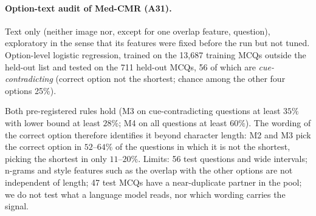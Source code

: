 \paragraph{Option-text audit of Med-CMR (A31).}
Text only (neither image nor, except for one overlap feature, question), exploratory in the sense that its features were fixed before the run but not tuned.
Option-level logistic regression, trained on the 13{,}687 training MCQs outside the held-out list and tested on the 711 held-out MCQs, 56 of which are \emph{cue-contradicting} (correct option not the shortest; chance among the other four options 25\%).
\begin{center}
\footnotesize
\setlength{\tabcolsep}{3pt}
\end{center}
Both pre-registered rules hold (M3 on cue-contradicting questions at least $35\%$ with lower bound at least $28\%$; M4 on all questions at least $60\%$).
The wording of the correct option therefore identifies it beyond character length: M2 and M3 pick the correct option in $52$--$64\%$ of the questions in which it is not the shortest, picking the shortest in only $11$--$20\%$.
Limits: 56 test questions and wide intervals; n-grams and style features such as the overlap with the other options are not independent of length; 47 test MCQs have a near-duplicate partner in the pool; we do not test what a language model reads, nor which wording carries the signal.

